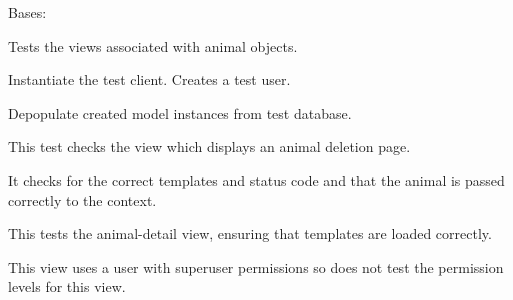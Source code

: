 \documentclass[letterpaper,10pt,english]{sphinxmanual}
\begin{document}

\begin{fulllineitems}
\label{api:mousedb.animal.tests.AnimalViewTests}
Bases: 

Tests the views associated with animal objects.


\begin{fulllineitems}
\label{api:mousedb.animal.tests.AnimalViewTests.setUp}
Instantiate the test client.  Creates a test user.

\end{fulllineitems}



\begin{fulllineitems}
\label{api:mousedb.animal.tests.AnimalViewTests.tearDown}
Depopulate created model instances from test database.

\end{fulllineitems}



\begin{fulllineitems}
\label{api:mousedb.animal.tests.AnimalViewTests.test_animal_delete}
This test checks the view which displays an animal deletion page.

It checks for the correct templates and status code and that the animal is passed correctly to the context.

\end{fulllineitems}



\begin{fulllineitems}
\label{api:mousedb.animal.tests.AnimalViewTests.test_animal_detail}
This tests the animal-detail view, ensuring that templates are loaded correctly.

This view uses a user with superuser permissions so does not test the permission levels for this view.


\end{fulllineitems}
\end{fulllineitems}
\end{document}
